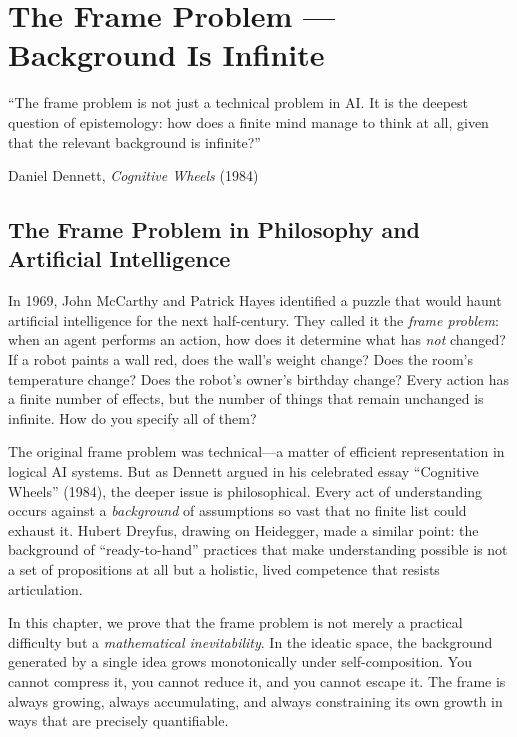 

\chapter{The Frame Problem --- Background Is Infinite}
\label{ch:frame-problem}

\epigraph{``The frame problem is not just a technical problem in AI.
It is the deepest question of epistemology: how does a finite mind
manage to think at all, given that the relevant background is
infinite?''}{Daniel Dennett, \textit{Cognitive Wheels} (1984)}

\section{The Frame Problem in Philosophy and Artificial Intelligence}

In 1969, John McCarthy and Patrick Hayes identified a puzzle that would
haunt artificial intelligence for the next half-century.  They called it
the \emph{frame problem}: when an agent performs an action, how does it
determine what has \emph{not} changed?  If a robot paints a wall red,
does the wall's weight change?  Does the room's temperature change?
Does the robot's owner's birthday change?  Every action has a finite
number of effects, but the number of things that remain unchanged is
infinite.  How do you specify all of them?

The original frame problem was technical---a matter of efficient
representation in logical AI systems.  But as Dennett argued in his
celebrated essay ``Cognitive Wheels'' (1984), the deeper issue is
philosophical.  Every act of understanding occurs against a
\emph{background} of assumptions so vast that no finite list could
exhaust it.  Hubert Dreyfus, drawing on Heidegger, made a similar
point: the background of ``ready-to-hand'' practices that make
understanding possible is not a set of propositions at all but a
holistic, lived competence that resists articulation.

In this chapter, we prove that the frame problem is not merely a
practical difficulty but a \emph{mathematical inevitability}.  In the
ideatic space, the background generated by a single idea grows
monotonically under self-composition.  You cannot compress it, you
cannot reduce it, and you cannot escape it.  The frame is always
growing, always accumulating, and always constraining its own growth
in ways that are precisely quantifiable.

